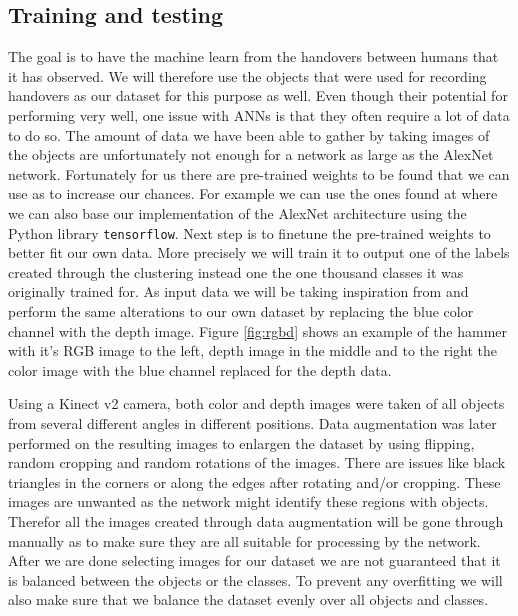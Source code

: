 \subsection{Training and testing}

The goal is to have the machine learn from the handovers between humans that it has observed. We will therefore use the objects that were used for recording handovers as our dataset for this purpose as well. Even though their potential for performing very well, one issue with ANNs is that they often require a lot of data to do so. The amount of data we have been able to gather by taking images of the objects are unfortunately not enough for a network as large as the AlexNet network. Fortunately for us there are pre-trained weights to be found that we can use as to increase our chances. For example we can use the ones found at \parencite{AlexNetImplWeights} where we can also base our implementation of the AlexNet architecture using the Python library \texttt{tensorflow}.  Next step is to finetune the pre-trained weights to better fit our own data. More precisely we will train it to output one of the labels created through the clustering instead one the one thousand classes it was originally trained for. As input data we will be taking inspiration from \parencite{Redmon2014} and perform the same alterations to our own dataset by replacing the blue color channel with the depth image. Figure \ref{fig:rgbd} shows an example of the hammer with it's RGB image to the left, depth image in the middle and to the right the color image with the blue channel replaced for the depth data.

Using a Kinect v2 camera, both color and depth images were taken of all objects from several different angles in different positions. Data augmentation was later performed on the resulting images to enlargen the dataset by using flipping, random cropping and random rotations of the images. There are issues like black triangles in the corners or along the edges after rotating and/or cropping. These images are unwanted as the network might identify these regions with objects. Therefor all the images created through data augmentation will be gone through manually as to make sure they are all suitable for processing by the network. After we are done selecting images for our dataset we are not guaranteed that it is balanced between the objects or the classes. To prevent any overfitting we will also make sure that we balance the dataset evenly over all objects and classes.

